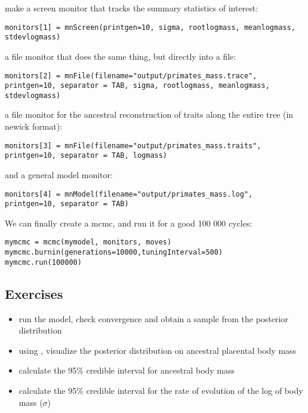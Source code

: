 make a screen monitor that tracks the summary statistics of interest:
{\tt \small \begin{snugshade*}
\begin{lstlisting}
monitors[1] = mnScreen(printgen=10, sigma, rootlogmass, meanlogmass, stdevlogmass)
\end{lstlisting}
\end{snugshade*}}

a file monitor that does the same thing, but directly into a file:
{\tt \small \begin{snugshade*}
\begin{lstlisting}
monitors[2] = mnFile(filename="output/primates_mass.trace", printgen=10, separator = TAB, sigma, rootlogmass, meanlogmass, stdevlogmass)
\end{lstlisting}
\end{snugshade*}}

a file monitor for the ancestral reconstruction of traits along the entire tree (in newick format):
{\tt \small \begin{snugshade*}
\begin{lstlisting}
monitors[3] = mnFile(filename="output/primates_mass.traits", printgen=10, separator = TAB, logmass)
\end{lstlisting}
\end{snugshade*}}

and a general model monitor:
{\tt \small \begin{snugshade*}
\begin{lstlisting}
monitors[4] = mnModel(filename="output/primates_mass.log", printgen=10, separator = TAB)
\end{lstlisting}
\end{snugshade*}}

We can finally create a mcmc, and run it for a good 100 000 cycles:
{\tt \small \begin{snugshade*}
\begin{lstlisting}
mymcmc = mcmc(mymodel, monitors, moves)
mymcmc.burnin(generations=10000,tuningInterval=500)
mymcmc.run(100000)
\end{lstlisting}
\end{snugshade*}}

\subsection*{Exercises}

\begin{itemize}
\item
run the model, check convergence and obtain a sample from the posterior distribution
\item
using , visualize the posterior distribution on ancestral placental body mass
\item
calculate the 95\% credible interval for ancestral body mass
\item
calculate the 95\% credible interval for the rate of evolution of the log of body mass ($\sigma$)
\end{itemize}


